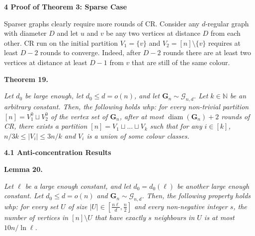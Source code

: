 \documentclass[10pt,a4paper]{article}
\begin{document}
\par\medskip\noindent\textbf{
4 Proof of Theorem 3: Sparse Case}\par




Sparser graphs clearly require more rounds of CR. Consider any $d$-regular graph with diameter $D$ and let $u$ and $v$ be any two vertices at distance $D$ from each other. CR run on the initial partition $V_{1}=\{v\}$ and $V_{2}=[n]\setminus\{v\}$ requires at least $D-2$ rounds to converge. Indeed, after $D-2$ rounds there are at least two vertices at distance at least $D-1$ from $v$ that are still of the same colour.\par





\par\medskip\noindent\textbf{
\textbf{Theorem 19}\textbf{.}
}\par



\emph{Let $d_{0}$ be large enough, let $d_{0}\leq d=o(n)$, and let $\mathbf{G}_{n}\sim\mathcal{G}_{n,d}$. Let $k\in\mathbb{N}$ be an arbitrary constant. Then, the following holds whp: for every non-trivial partition $[n]=V_{1}^{0}\sqcup V_{2}^{0}$ of the vertex set of $\mathbf{G}_{n}$, after at most $\operatorname{diam}(\mathbf{G}_{n})+2$ rounds of CR, there exists a partition $[n]=V_{1}\sqcup\ldots\sqcup V_{k}$ such that for any $i\in[k]$, $n/3k\leq|V_{i}|\leq 3n/k$ and $V_{i}$ is a union of some colour classes.}\par






\par\medskip\noindent\textbf{
4.1 Anti-concentration Results}\par





\par\medskip\noindent\textbf{
\textbf{Lemma 20}\textbf{.}
}\par



\emph{Let $\ell$ be a large enough constant, and let $d_{0}=d_{0}(\ell)$ be another large enough constant. Let $d_{0}\leq d=o(n)$ and $\mathbf{G}_{n}\sim\mathcal{G}_{n,d}$. Then, the following property holds whp: for every set $U$ of size $|U|\in[\frac{n\ell}{d},\frac{n}{2}]$ and every non-negative integer $s$, the number of vertices in $[n]\setminus U$ that have exactly $s$ neighbours in $U$ is at most $10n/\ln\ell$.}\par
\end{document}

